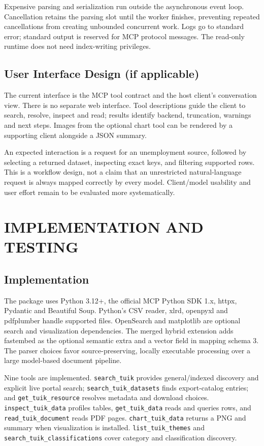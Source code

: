 \documentclass[a4paper,12pt]{report}
\newcommand{\code}[1]{\texttt{\small #1}}
\begin{document}
Expensive parsing and serialization run outside the asynchronous event loop. Cancellation retains the parsing slot until the worker finishes, preventing repeated cancellations from creating unbounded concurrent work. Logs go to standard error; standard output is reserved for MCP protocol messages. The read-only runtime does not need index-writing privileges.

\section{User Interface Design (if applicable)}
The current interface is the MCP tool contract and the host client's conversation view. There is no separate web interface. Tool descriptions guide the client to search, resolve, inspect and read; results identify backend, truncation, warnings and next steps. Images from the optional chart tool can be rendered by a supporting client alongside a JSON summary.

An expected interaction is a request for an unemployment source, followed by selecting a returned dataset, inspecting exact keys, and filtering supported rows. This is a workflow design, not a claim that an unrestricted natural-language request is always mapped correctly by every model. Client/model usability and user effort remain to be evaluated more systematically.

\chapter{IMPLEMENTATION AND TESTING}
\section{Implementation}
The package uses Python 3.12+, the official MCP Python SDK 1.x, httpx, Pydantic and Beautiful Soup. Python's CSV reader, xlrd, openpyxl and pdfplumber handle supported files. OpenSearch and matplotlib are optional search and visualization dependencies. The merged hybrid extension adds fastembed as the optional semantic extra and a vector field in mapping schema 3. The parser choices favor source-preserving, locally executable processing over a large model-based document pipeline.

Nine tools are implemented. \code{search\_tuik} provides general/indexed discovery and explicit live portal search; \code{search\_tuik\_datasets} finds export-catalog entries; and \code{get\_tuik\_resource} resolves metadata and download choices. \code{inspect\_tuik\_data} profiles tables, \code{get\_tuik\_data} reads and queries rows, and \code{read\_tuik\_document} reads PDF pages. \code{chart\_tuik\_data} returns a PNG and summary when visualization is installed. \code{list\_tuik\_themes} and \code{search\_tuik\_classifications} cover category and classification discovery.
\end{document}
